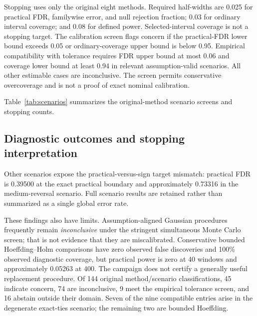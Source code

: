 Stopping uses only the original eight methods. Required half-widths are
0.025 for practical FDR, familywise error, and null rejection fraction;
0.03 for ordinary interval coverage; and 0.08 for defined power.
Selected-interval coverage is not a stopping target.
The calibration screen flags concern if the practical-FDR lower bound
exceeds 0.05 or ordinary-coverage upper bound is below 0.95. Empirical
compatibility with tolerance requires FDR upper bound at most 0.06 and
coverage lower bound at least 0.94 in relevant assumption-valid scenarios.
All other estimable cases are inconclusive. The screen permits conservative
overcoverage and is not a proof of exact nominal calibration.

Table~\ref{tab:scenarios} summarizes the original-method scenario screens
and stopping counts.

\begin{table}[!htbp]
\centering\small\setlength{\tabcolsep}{5pt}
\caption{Complete original-eight scenario screen and stopping counts.
C: calibration concern; I: inconclusive; E: empirical compatibility with
tolerance; A: outside-domain abstention. P: original precision objective
met; M: maximum-count stop with gaps. H-S/H-F/H-BY: historical screened
BH/full BH/plus-one BY; t/c-t/O/G/Hf: IID t/cluster t/oracle normal/grouped
bootstrap/bounded Hoeffding. These use the \emph{original-eight} uncertainty
family. Full numerical results for all 17 methods and both families are
in \texttt{stat01-all-endpoints.csv}.}
\label{tab:scenarios}
\end{table}

\subsection{Diagnostic outcomes and stopping interpretation}
Other
scenarios expose the practical-versus-sign target mismatch: practical FDR
is 0.39500 at the exact practical boundary and approximately 0.73316 in the
medium-reversal scenario. Full scenario results are retained rather than
summarized as a single global error rate.

These findings also have limits. Assumption-aligned Gaussian procedures
frequently remain \emph{inconclusive} under the stringent simultaneous
Monte Carlo screen; that is not evidence that they are miscalibrated.
Conservative bounded Hoeffding--Holm comparisons have zero observed false
discoveries and 100\% observed diagnostic coverage, but practical power is
zero at 40 windows and approximately 0.05263 at 400. The campaign does not
certify a generally useful replacement procedure. Of 144 original
method/scenario classifications, 45 indicate concern, 74 are inconclusive,
9 meet the empirical tolerance screen, and 16 abstain outside their domain.
Seven of the nine compatible entries arise in the degenerate exact-ties
scenario; the remaining two are bounded Hoeffding.

